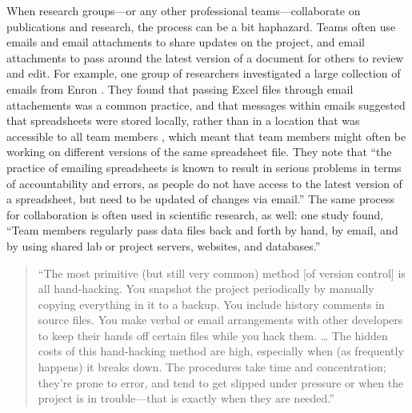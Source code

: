 \documentclass[]{tufte-book}
\begin{document}
When research groups---or any other professional teams---collaborate on
publications and research, the process can be a bit haphazard. Teams often use
emails and email attachments to share updates on the project, and email
attachments to pass around the latest version of a document for others to review
and edit. For example, one group of researchers investigated a large collection
of emails from Enron \citep{hermans2015enron}. They found that passing Excel files
through email attachements was a common practice, and that messages within
emails suggested that spreadsheets were stored locally, rather than in a
location that was accessible to all team members \citep{hermans2015enron}, which
meant that team members might often be working on different versions of the same
spreadsheet file. They note that ``the practice of emailing spreadsheets is known
to result in serious problems in terms of accountability and errors, as people
do not have access to the latest version of a spreadsheet, but need to be
updated of changes via email.'' \citep{hermans2015enron} The same process for
collaboration is often used in scientific research, as well: one study found,
``Team members regularly pass data files back and forth by hand, by email, and by
using shared lab or project servers, websites, and databases.''
\citep{edwards2011science}

\begin{quote}
``The most primitive (but still very common) method {[}of version control{]} is all
hand-hacking. You snapshot the project periodically by manually copying
everything in it to a backup. You include history comments in source files. You
make verbal or email arrangements with other developers to keep their hands off
certain files while you hack them. \ldots{} The hidden costs of this hand-hacking
method are high, especially when (as frequently happens) it breaks down. The
procedures take time and concentration; they're prone to error, and tend to get
slipped under pressure or when the project is in trouble---that is exactly when
they are needed.'' \citep{raymond2003art}
\end{quote}
\end{document}
